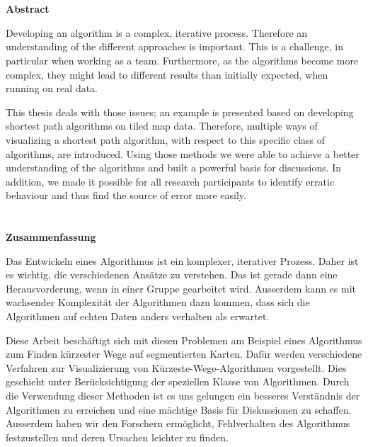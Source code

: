 \chapter*{}
\addtocounter{page}{-1}

\begin{center}
    \large \textbf{Abstract}
\end{center}

Developing an algorithm is a complex, iterative process.
Therefore an understanding of the different approaches is important.
This is a challenge, in particular when working as a team.
Furthermore, as the algorithms become more complex, they might lead to different results than initially expected, when running on real data.

This thesis deals with those issues; an example is presented based on developing shortest path algorithms on tiled map data.
Therefore, multiple ways of visualizing a shortest path algorithm, with respect to this specific class of algorithms, are introduced.
Using those methods we were able to achieve a better understanding of the algorithms and built a powerful basis for discussions.
In addition, we made it possible for all research participants to identify erratic behaviour and thus find the source of error more easily.

\newpage\null\thispagestyle{empty}\addtocounter{page}{-1}\newpage
\chapter*{}

\begin{center}
    \large \textbf{Zusammenfassung}
\end{center}

Das Entwickeln eines Algorithmus ist ein komplexer, iterativer Prozess.
Daher ist es wichtig, die verschiedenen Ansätze zu verstehen.
Das ist gerade dann eine Herausvorderung, wenn in einer Gruppe gearbeitet wird.
Ausserdem kann es mit wachsender Komplexität der Algorithmen dazu kommen, dass sich die Algorithmen auf echten Daten anders verhalten als erwartet.

Diese Arbeit beschäftigt sich mit diesen Problemen am Beispiel eines Algorithmus zum Finden kürzester Wege auf segmentierten Karten.
Dafür werden verschiedene Verfahren zur Visualizierung von Kürzeste-Wege-Algorithmen vorgestellt.
Dies geschieht unter Berücksichtigung der speziellen Klasse von Algorithmen.
Durch die Verwendung dieser Methoden ist es uns gelungen ein besseres Verständnis der Algorithmen zu erreichen und eine mächtige Basis für Diskussionen zu schaffen.
Ausserdem haben wir den Forschern ermöglicht, Fehlverhalten des Algorithmus festzustellen und deren Ursachen leichter zu finden.
